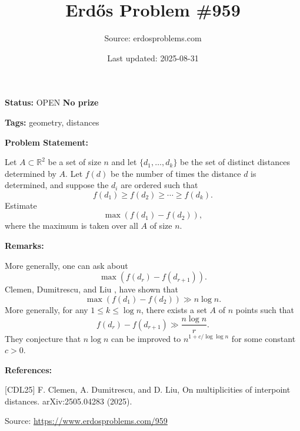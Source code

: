 \documentclass{article}
\title{Erd\H{o}s Problem \#959}
\date{Last updated: 2025-08-31}
\author{Source: erdosproblems.com}
\begin{document}
\maketitle

\noindent\textbf{Status:} OPEN \quad \textbf{No prize}

\noindent\textbf{Tags:} geometry, distances

\medskip
\noindent\textbf{Problem Statement:}

Let $A\subset \mathbb{R}^2$ be a set of size $n$ and let $\{d_1,\ldots,d_k\}$ be the set of distinct distances determined by $A$. Let $f(d)$ be the number of times the distance $d$ is determined, and suppose the $d_i$ are ordered such that\[f(d_1)\geq f(d_2)\geq \cdots \geq f(d_k).\]Estimate\[\max (f(d_1)-f(d_2)),\]where the maximum is taken over all $A$ of size $n$.

\bigskip
\noindent\textbf{Remarks:}

More generally, one can ask about\[\max (f(d_r)-f(d_{r+1})).\]Clemen, Dumitrescu, and Liu \cite{CDL25}, have shown that\[\max (f(d_1)-f(d_2))\gg n\log n.\]More generally, for any $1\leq k\leq \log n$, there exists a set $A$ of $n$ points such that\[f(d_r)-f(d_{r+1})\gg \frac{n\log n}{r}.\]They conjecture that $n\log n$ can be improved to $n^{1+c/\log\log n}$ for some constant $c>0$.

\bigskip
\noindent\textbf{References:}

[CDL25] F. Clemen, A. Dumitrescu, and D. Liu, On multiplicities of interpoint distances. arXiv:2505.04283 (2025).

\bigskip
\noindent\small{Source: \url{https://www.erdosproblems.com/959}}
\end{document}
